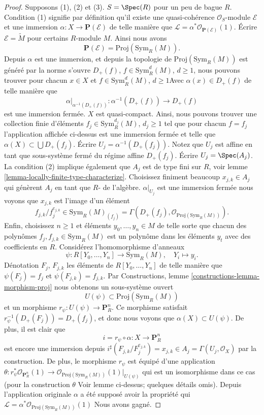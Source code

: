 \begin{proof}

Supposons (1), (2) et (3). $S = \Spec(R)$ pour un peu de bague $R$. Condition (1) signifie par définition qu'il existe une quasi-cohérence $\mathcal{O}_S$-module
$\mathcal{E}$ et une immersion $\alpha : X \to \mathbf{P}(\mathcal{E})$
de telle manière que $\mathcal{L} = \alpha^*\mathcal{O}_{\mathbf{P}(\mathcal{E})}(1)$. Écrire $\mathcal{E} = \widetilde{M}$ pour certains $R$-module $M$. Ainsi nous avons
$$
\mathbf{P}(\mathcal{E}) = \text{Proj}(\text{Sym}_R(M)).
$$
Depuis $\alpha$ est une immersion, et depuis la topologie de
$\text{Proj}(\text{Sym}_R(M))$ est généré par la norme s'ouvre $D_{+}(f)$, $f \in \text{Sym}_R^d(M)$, $d \geq 1$, nous pouvons trouver pour chacun $x \in X$ et
$f \in \text{Sym}_R^d(M)$, $d \geq 1$Avec $\alpha(x) \in D_{+}(f)$
de telle manière que
$$
\alpha|_{\alpha^{-1}(D_{+}(f))} : \alpha^{-1}(D_{+}(f)) \to D_{+}(f)
$$
est une immersion fermée. $X$ est quasi-compact. Ainsi, nous pouvons trouver une collection finie d'éléments
$f_j \in \text{Sym}_R^{d_j}(M)$, $d_j \geq 1$
tel que pour chacun $f = f_j$ l'application affichée ci-dessus est une immersion fermée et telle que $\alpha(X) \subset \bigcup D_{+}(f_j)$. Écrire $U_j = \alpha^{-1}(D_{+}(f_j))$. Notez que $U_j$ est affine en tant que sous-système fermé du régime affine $D_{+}(f_j)$. Écrire $U_j = \Spec(A_j)$. La condition (2) implique également que
$A_j$ est de type fini sur $R$, voir lemme \ref{lemma-locally-finite-type-characterize}. Choisissez finiment beaucoup $x_{j, k} \in A_j$ qui génèrent $A_j$ en tant que $R$- de l'algèbre. $\alpha|_{U_j}$ est une immersion fermée nous voyons que $x_{j, k}$ est l'image d'un élément
$$
f_{j, k}/f_j^{e_{j, k}} \in \text{Sym}_R(M)_{(f_j)}
=
\Gamma(D_{+}(f_j), \mathcal{O}_{\text{Proj}(\text{Sym}_R(M))}).
$$
Enfin, choisissez $n \geq 1$ et éléments $y_0, \ldots, y_n \in M$ de telle sorte que chacun des polynômes $f_j, f_{j, k} \in \text{Sym}_R(M)$ est un polynôme dans les éléments $y_t$ avec des coefficients en $R$. Considérez l'homomorphisme d'anneaux
$$
\psi : R[Y_0, \ldots, Y_n] \longrightarrow \text{Sym}_R(M),
\quad Y_i \longmapsto y_i.
$$
Dénotation $F_j$, $F_{j, k}$ les éléments de $R[Y_0, \ldots, Y_n]$ de telle manière que $\psi(F_j) = f_j$ et $\psi(F_{j, k}) = f_{j, k}$. Par Constructions, lemme \ref{constructions-lemma-morphism-proj}
nous obtenons un sous-système ouvert
$$
U(\psi) \subset \text{Proj}(\text{Sym}_R(M))
$$
et un morphisme
$r_\psi : U(\psi) \to \mathbf{P}^n_R$. Ce morphisme satisfait $r_\psi^{-1}(D_{+}(F_j)) = D_{+}(f_j)$, et donc nous voyons que $\alpha(X) \subset U(\psi)$. De plus, il est clair que
$$
i = r_\psi \circ \alpha : X \longrightarrow \mathbf{P}^n_R
$$
est encore une immersion depuis
$i^\sharp(F_{j, k}/F_j^{e_{j, k}}) = x_{j, k} \in
A_j = \Gamma(U_j, \mathcal{O}_X)$
par la construction. De plus, le morphisme $r_\psi$ est équipé d'une application
$\theta : r_\psi^*\mathcal{O}_{\mathbf{P}^n_R}(1)
\to \mathcal{O}_{\text{Proj}(\text{Sym}_R(M))}(1)|_{U(\psi)}$
qui est un isomorphisme dans ce cas (pour la construction $\theta$
Voir lemme ci-dessus; quelques détails omis). Depuis l'application originale $\alpha$ a été supposé avoir la propriété qui
$\mathcal{L} = \alpha^*\mathcal{O}_{\text{Proj}(\text{Sym}_R(M))}(1)$
Nous avons gagné.


\end{proof}
